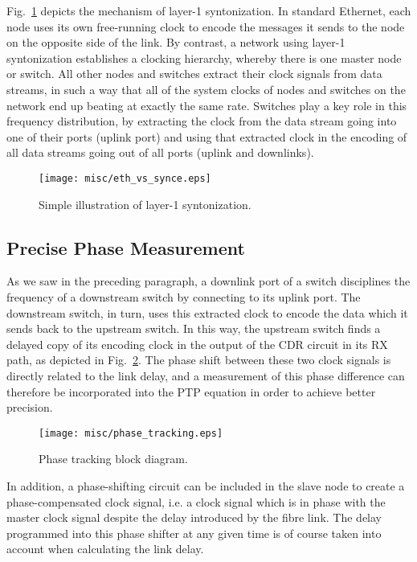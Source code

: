 \documentclass{../JAC2003}
\begin{document}
Fig.~\ref{synce-fig} depicts the mechanism of layer-1
syntonization. In standard Ethernet, each node uses its own
free-running clock to encode the messages it sends to the node on the
opposite side of the link. By contrast, a network using layer-1
syntonization establishes a clocking hierarchy, whereby there is one
master node or switch. All other nodes and switches extract their
clock signals from data streams, in such a way that all of the system
clocks of nodes and switches on the network end up beating at exactly
the same rate. Switches play a key role in this frequency
distribution, by extracting the clock from the data stream going into
one of their ports (uplink port) and using that extracted clock in the
encoding of all data streams going out of all ports (uplink and
downlinks).

\begin{figure}[htb]
   \centering
   \texttt{[image: misc/eth\_vs\_synce.eps]}
   \caption{Simple illustration of layer-1 syntonization.}
   \label{synce-fig}
\end{figure}

\subsection{Precise Phase Measurement}

As we saw in the preceding paragraph, a downlink port of a switch
disciplines the frequency of a downstream switch by connecting to its
uplink port. The downstream switch, in turn, uses this extracted clock
to encode the data which it sends back to the upstream switch. In this
way, the upstream switch finds a delayed copy of its encoding clock in
the output of the CDR circuit in its RX path, as depicted in
Fig.~\ref{phase-tracking-fig}. The phase shift between these two clock
signals is directly related to the link delay, and a measurement of
this phase difference can therefore be incorporated into the PTP
equation in order to achieve better precision. 

\begin{figure}[htb]
   \centering
   \texttt{[image: misc/phase\_tracking.eps]}
   \caption{Phase tracking block diagram.}
   \label{phase-tracking-fig}
\end{figure}

In addition, a phase-shifting circuit can be included in the slave
node to create a phase-compensated clock signal, i.e. a clock signal
which is in phase with the master clock signal despite the delay
introduced by the fibre link. The delay programmed into this phase
shifter at any given time is of course taken into account when
calculating the link delay.
\end{document}
